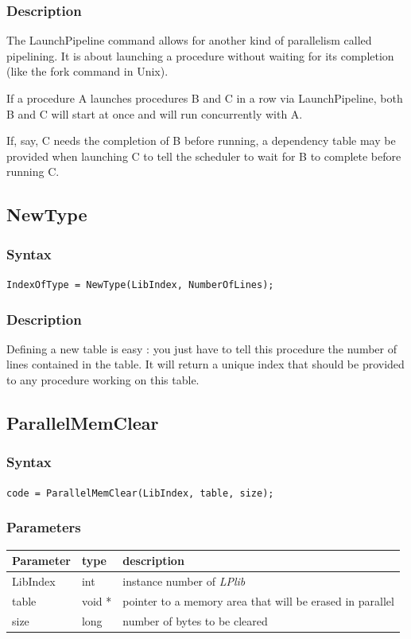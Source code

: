 \documentclass[a4paper,12pt]{article}
\begin{document}
\subsubsection*{Description}
The LaunchPipeline command allows for another kind of parallelism called pipelining. It is about launching a procedure without waiting for its completion (like the fork command in Unix).

If a procedure A launches procedures B and C in a row via LaunchPipeline, both B and C will start at once and will run concurrently with A.

If, say, C needs the completion of B before running, a dependency table may be provided when launching C to tell the scheduler to wait for B to complete before running C.


\subsection{NewType}

\subsubsection*{Syntax}
\tt{IndexOfType = NewType(LibIndex, NumberOfLines);}
\normalfont

\subsubsection*{Description}
Defining a new table is easy : you just have to tell this procedure the number of lines contained in the table. It will return a unique index that should be provided to any procedure working on this table.


\subsection{ParallelMemClear}

\subsubsection*{Syntax}
\tt{code = ParallelMemClear(LibIndex, table, size);}
\normalfont

\subsubsection*{Parameters}
\begin{tabular}{|m{2cm}|m{1.5cm}|m{10.5cm}|}
\hline
Parameter  & type   & description \\
\hline
LibIndex   & int    & instance number of \emph{LPlib} \\
\hline
table      & void * & pointer to a memory area that will be erased in parallel \\
\hline
size       & long   & number of bytes to be cleared \\
\hline
\end{tabular}
\end{document}
